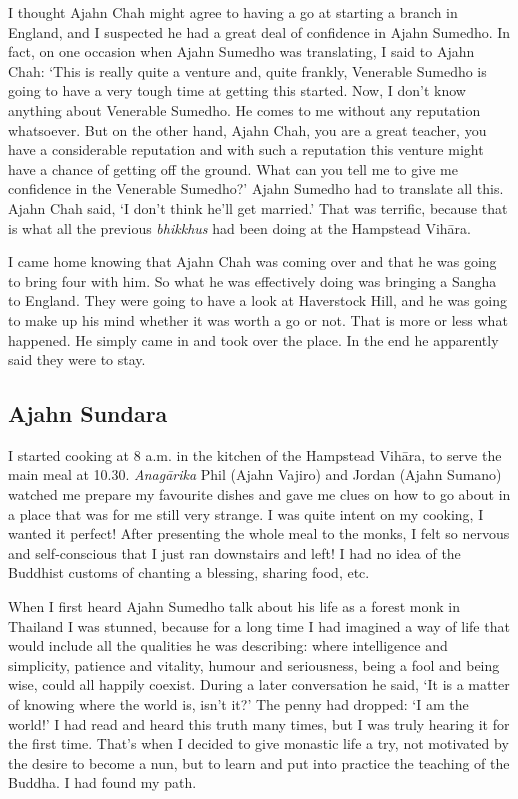 I thought Ajahn Chah might agree to having a go at starting a branch in
England, and I suspected he had a great deal of confidence in Ajahn
Sumedho. In fact, on one occasion when Ajahn Sumedho was translating, I
said to Ajahn Chah: `This is really quite a venture and, quite frankly, 
Venerable Sumedho is going to have a very tough time at getting this
started. Now, I don't know anything about Venerable Sumedho. He comes to
me without any reputation whatsoever. But on the other hand, Ajahn Chah, 
you are a great teacher, you have a considerable reputation and with
such a reputation this venture might have a chance of getting off the
ground. What can you tell me to give me confidence in the Venerable
Sumedho?' Ajahn Sumedho had to translate all this. Ajahn Chah said, `I
don't think he'll get married.' That was terrific, because that is what
all the previous \emph{bhikkhus} had been doing at the Hampstead Vihāra.

I came home knowing that Ajahn Chah was coming over and that he was
going to bring four with him. So what he was effectively doing was
bringing a Sangha to England. They were going to have a look at
Haverstock Hill, and he was going to make up his mind whether it was
worth a go or not. That is more or less what happened. He simply came in
and took over the place. In the end he apparently said they were to
stay. 

\subsection{Ajahn Sundara}

I started cooking at 8 a.m. in the kitchen of the Hampstead Vihāra, to
serve the main meal at 10.30. \emph{Anagārika} Phil (Ajahn Vajiro) and
Jordan (Ajahn Sumano) watched me prepare my favourite dishes and gave me
clues on how to go about in a place that was for me still very strange. 
I was quite intent on my cooking, I wanted it perfect! After presenting
the whole meal to the monks, I felt so nervous and self-conscious that I
just ran downstairs and left! I had no idea of the Buddhist customs of
chanting a blessing, sharing food, etc. 

When I first heard Ajahn Sumedho talk about his life as a forest monk in
Thailand I was stunned, because for a long time I had imagined a way of
life that would include all the qualities he was describing: where
intelligence and simplicity, patience and vitality, humour and
seriousness, being a fool and being wise, could all happily coexist. 
During a later conversation he said, `It is a matter of knowing where
the world is, isn't it?' The penny had dropped: `I am the world!' I had
read and heard this truth many times, but I was truly hearing it for the
first time. That's when I decided to give monastic life a try, not
motivated by the desire to become a nun, but to learn and put into
practice the teaching of the Buddha. I had found my path. 


